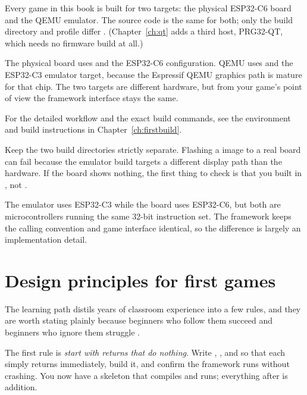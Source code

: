 Every game in this book is built for two targets: the physical ESP32\nobreakdash-C6
board and the QEMU emulator. The source code is the same for both; only the build
directory and profile differ \citep{prg32qemu}. (Chapter~\ref{ch:qt} adds a third
host, PRG32-QT, which needs no firmware build at all.)

The physical board uses  and the ESP32\nobreakdash-C6 configuration.
QEMU uses  and the ESP32\nobreakdash-C3 emulator target, because the
Espressif QEMU graphics path is mature for that chip. The two targets are different
hardware, but from your game's point of view the framework interface stays the same.

For the detailed workflow and the exact build commands, see the environment and
build instructions in Chapter~\ref{ch:firstbuild}.

\begin{prgwarn}
Keep the two build directories strictly separate. Flashing a 
image to a real board can fail because the emulator build targets a different
display path than the hardware. If the board shows nothing, the first thing to
check is that you built in , not 
\citep{prg32qemu}.
\end{prgwarn}

\begin{prgaside}
The emulator uses ESP32\nobreakdash-C3 while the board uses ESP32\nobreakdash-C6, but both are
\riscv microcontrollers running the same 32-bit instruction set. The framework
keeps the calling convention and game interface identical, so the difference is
largely an implementation detail.
\end{prgaside}

\section{Design principles for first games}

The \prg learning path distils years of classroom experience into a few rules,
and they are worth stating plainly because beginners who follow them succeed and
beginners who ignore them struggle \citep{prg32repo,prg32tutorial}.

The first rule is \emph{start with returns that do nothing}. Write ,
, and  so that each simply returns immediately, build it,
and confirm the framework runs without crashing. You now have a skeleton that
compiles and runs; everything after is addition.

